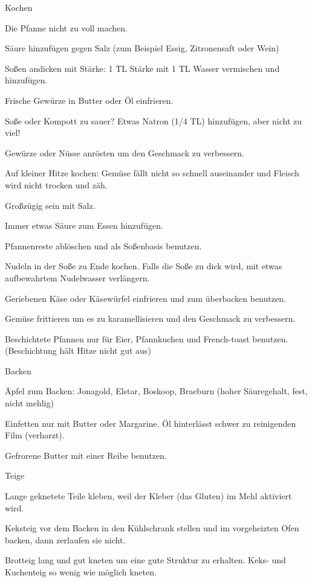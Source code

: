 Kochen
\begin{compactitem}
\item Die Pfanne nicht zu voll machen.
\item Säure hinzufügen gegen Salz (zum Beispiel Essig, Zitronensaft oder Wein)
\item Soßen andicken mit Stärke: 1 TL Stärke mit 1 TL Wasser vermischen und hinzufügen.
\item Frische Gewürze in Butter oder Öl einfrieren.
\item Soße oder Kompott zu sauer? Etwas Natron (1/4 TL) hinzufügen, aber nicht zu viel!
\item Gewürze oder Nüsse anrösten um den Geschmack zu verbessern.
\item Auf kleiner Hitze kochen: Gemüse fällt nicht so schnell auseinander und Fleisch wird nicht trocken und zäh.
\item Großzügig sein mit Salz.
\item Immer etwas Säure zum Essen hinzufügen.
\item Pfannenreste ablöschen und als Soßenbasis benutzen.
\item Nudeln in der Soße zu Ende kochen. Falls die Soße zu dick wird, mit etwas aufbewahrtem Nudelwasser verlängern.
\item Geriebenen Käse oder Käsewürfel einfrieren und zum überbacken benutzen.
\item Gemüse frittieren um es zu karamellisieren und den Geschmack zu verbessern.
\item Beschichtete Pfannen nur für Eier, Pfannkuchen und French-toast benutzen. (Beschichtung hält Hitze nicht gut aus)
\end{compactitem}

Backen
\begin{compactitem}
\item Äpfel zum Backen: Jonagold, Elstar, Boskoop, Braeburn (hoher Säuregehalt, fest, nicht mehlig)
\item Einfetten nur mit Butter oder Margarine. Öl hinterlässt schwer zu reinigenden Film (verharzt).
\item Gefrorene Butter mit einer Reibe benutzen.
\end{compactitem}

Teige
\begin{compactitem}
\item Lange geknetete Teile kleben, weil der Kleber (das Gluten) im Mehl aktiviert wird.
\item Keksteig vor dem Backen in den Kühlschrank stellen und im vorgeheizten Ofen backen, dann zerlaufen sie nicht.
\item Brotteig lang und gut kneten um eine gute Struktur zu erhalten. Keks- und Kuchenteig so wenig wie möglich kneten.
\end{compactitem}


